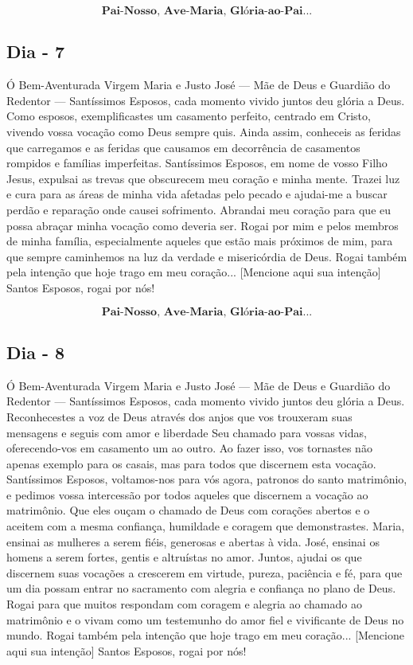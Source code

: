 \documentclass[a4paper,14pt]{extarticle} \usepackage[utf8]{inputenc}
\begin{document}
\[\textbf{Pai-Nosso, Ave-Maria, Glória-ao-Pai...}\]

\subsection{Dia - 7}

Ó Bem-Aventurada Virgem Maria e Justo José — Mãe de Deus e Guardião do Redentor — Santíssimos Esposos, cada momento vivido juntos deu glória a Deus.
Como esposos, exemplificastes um casamento perfeito, centrado em Cristo, vivendo vossa vocação como Deus sempre quis. Ainda assim, conheceis as feridas que carregamos e as feridas que causamos em decorrência de casamentos rompidos e famílias imperfeitas. Santíssimos Esposos, em nome de vosso Filho Jesus, expulsai as trevas que obscurecem meu coração e minha mente. Trazei luz e cura para as áreas de minha vida afetadas pelo pecado e ajudai-me a buscar perdão e reparação onde causei sofrimento. Abrandai meu coração para que eu possa abraçar minha vocação como deveria ser.
Rogai por mim e pelos membros de minha família, especialmente aqueles que estão mais próximos de mim, para que sempre caminhemos na luz da verdade e misericórdia de Deus.
Rogai também pela intenção que hoje trago em meu coração... [Mencione aqui sua intenção] Santos Esposos, rogai por nós!

\[\textbf{Pai-Nosso, Ave-Maria, Glória-ao-Pai...}\]

\subsection{Dia - 8}

Ó Bem-Aventurada Virgem Maria e Justo José — Mãe de Deus e Guardião do Redentor — Santíssimos Esposos, cada momento vivido juntos deu glória a Deus.
Reconhecestes a voz de Deus através dos anjos que vos trouxeram suas mensagens e seguis com amor e liberdade Seu chamado para vossas vidas, oferecendo-vos em casamento um ao outro. Ao fazer isso, vos tornastes não apenas exemplo para os casais, mas para todos que discernem esta vocação.
Santíssimos Esposos, voltamos-nos para vós agora, patronos do santo matrimônio, e pedimos vossa intercessão por todos aqueles que discernem a vocação ao matrimônio. Que eles ouçam o chamado de Deus com corações abertos e o aceitem com a mesma confiança, humildade e coragem que demonstrastes. Maria, ensinai as mulheres a serem fiéis, generosas e abertas à vida. José, ensinai os homens a serem fortes, gentis e altruístas no amor. Juntos, ajudai os que discernem suas vocações a crescerem em virtude, pureza, paciência e fé, para que um dia possam entrar no sacramento com alegria e confiança no plano de Deus. Rogai para que muitos respondam com coragem e alegria ao chamado ao matrimônio e o vivam como um testemunho do amor fiel e vivificante de Deus no mundo. Rogai também pela intenção que hoje trago em meu coração... [Mencione aqui sua intenção] Santos Esposos, rogai por nós!
\end{document}
